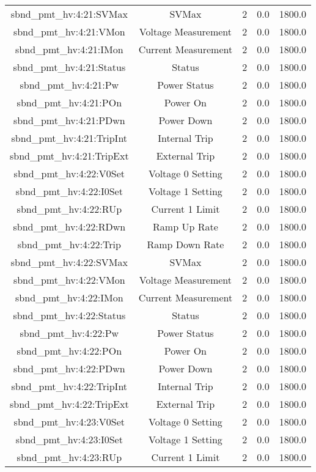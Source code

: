 \begin{table}[ptb]
\begin{tabular}{c | c c c c}
sbnd_pmt_hv:4:21:SVMax & SVMax & 2 & 0.0 & 1800.0\\ 
sbnd_pmt_hv:4:21:VMon & Voltage Measurement & 2 & 0.0 & 1800.0\\ 
sbnd_pmt_hv:4:21:IMon & Current Measurement & 2 & 0.0 & 1800.0\\ 
sbnd_pmt_hv:4:21:Status & Status & 2 & 0.0 & 1800.0\\ 
sbnd_pmt_hv:4:21:Pw & Power Status & 2 & 0.0 & 1800.0\\ 
sbnd_pmt_hv:4:21:POn & Power On & 2 & 0.0 & 1800.0\\ 
sbnd_pmt_hv:4:21:PDwn & Power Down & 2 & 0.0 & 1800.0\\ 
sbnd_pmt_hv:4:21:TripInt & Internal Trip & 2 & 0.0 & 1800.0\\ 
sbnd_pmt_hv:4:21:TripExt & External Trip & 2 & 0.0 & 1800.0\\ 
sbnd_pmt_hv:4:22:V0Set & Voltage 0 Setting & 2 & 0.0 & 1800.0\\ 
sbnd_pmt_hv:4:22:I0Set & Voltage 1 Setting & 2 & 0.0 & 1800.0\\ 
sbnd_pmt_hv:4:22:RUp & Current 1 Limit & 2 & 0.0 & 1800.0\\ 
sbnd_pmt_hv:4:22:RDwn & Ramp Up Rate & 2 & 0.0 & 1800.0\\ 
sbnd_pmt_hv:4:22:Trip & Ramp Down Rate & 2 & 0.0 & 1800.0\\ 
sbnd_pmt_hv:4:22:SVMax & SVMax & 2 & 0.0 & 1800.0\\ 
sbnd_pmt_hv:4:22:VMon & Voltage Measurement & 2 & 0.0 & 1800.0\\ 
sbnd_pmt_hv:4:22:IMon & Current Measurement & 2 & 0.0 & 1800.0\\ 
sbnd_pmt_hv:4:22:Status & Status & 2 & 0.0 & 1800.0\\ 
sbnd_pmt_hv:4:22:Pw & Power Status & 2 & 0.0 & 1800.0\\ 
sbnd_pmt_hv:4:22:POn & Power On & 2 & 0.0 & 1800.0\\ 
sbnd_pmt_hv:4:22:PDwn & Power Down & 2 & 0.0 & 1800.0\\ 
sbnd_pmt_hv:4:22:TripInt & Internal Trip & 2 & 0.0 & 1800.0\\ 
sbnd_pmt_hv:4:22:TripExt & External Trip & 2 & 0.0 & 1800.0\\ 
sbnd_pmt_hv:4:23:V0Set & Voltage 0 Setting & 2 & 0.0 & 1800.0\\ 
sbnd_pmt_hv:4:23:I0Set & Voltage 1 Setting & 2 & 0.0 & 1800.0\\ 
sbnd_pmt_hv:4:23:RUp & Current 1 Limit & 2 & 0.0 & 1800.0\\ 

\end{tabular}
\end{table}
